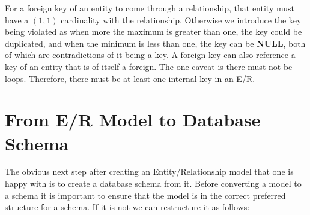 \documentclass{report}
\begin{document}
For a foreign key of an entity to come through a relationship, that entity must have a $(1,1)$ cardinality with the relationship. Otherwise we introduce the key being violated as when more the maximum is greater than one, the key could be duplicated, and when the minimum is less than one, the key can be \textbf{NULL}, both of which are contradictions of it being a key. A foreign key can also reference a key of an entity that is of itself a foreign. The one caveat is there must not be loops. Therefore, there must be at least one internal key in an E/R.


\section{From E/R Model to Database Schema}

The obvious next step after creating an Entity/Relationship model that one is happy with is to create a database schema from it. Before converting a model to a schema it is important to ensure that the model is in the correct preferred structure for a schema. If it is not we can restructure it as follows:
\end{document}

